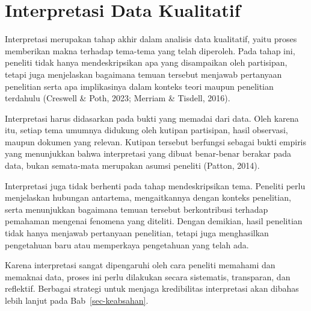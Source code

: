 \documentclass[
  indonesian,
  letterpaper,
  DIV=11,
  numbers=noendperiod]{scrreprt}
\begin{document}
\section{Interpretasi Data
Kualitatif}\label{interpretasi-data-kualitatif}

Interpretasi merupakan tahap akhir dalam analisis data kualitatif, yaitu
proses memberikan makna terhadap tema-tema yang telah diperoleh. Pada
tahap ini, peneliti tidak hanya mendeskripsikan apa yang disampaikan
oleh partisipan, tetapi juga menjelaskan bagaimana temuan tersebut
menjawab pertanyaan penelitian serta apa implikasinya dalam konteks
teori maupun penelitian terdahulu (Creswell \& Poth, 2023; Merriam \&
Tisdell, 2016).

Interpretasi harus didasarkan pada bukti yang memadai dari data. Oleh
karena itu, setiap tema umumnya didukung oleh kutipan partisipan, hasil
observasi, maupun dokumen yang relevan. Kutipan tersebut berfungsi
sebagai bukti empiris yang menunjukkan bahwa interpretasi yang dibuat
benar-benar berakar pada data, bukan semata-mata merupakan asumsi
peneliti (Patton, 2014).

Interpretasi juga tidak berhenti pada tahap mendeskripsikan tema.
Peneliti perlu menjelaskan hubungan antartema, mengaitkannya dengan
konteks penelitian, serta menunjukkan bagaimana temuan tersebut
berkontribusi terhadap pemahaman mengenai fenomena yang diteliti. Dengan
demikian, hasil penelitian tidak hanya menjawab pertanyaan penelitian,
tetapi juga menghasilkan pengetahuan baru atau memperkaya pengetahuan
yang telah ada.

Karena interpretasi sangat dipengaruhi oleh cara peneliti memahami dan
memaknai data, proses ini perlu dilakukan secara sistematis, transparan,
dan reflektif. Berbagai strategi untuk menjaga kredibilitas interpretasi
akan dibahas lebih lanjut pada Bab~\ref{sec-keabsahan}.
\end{document}
